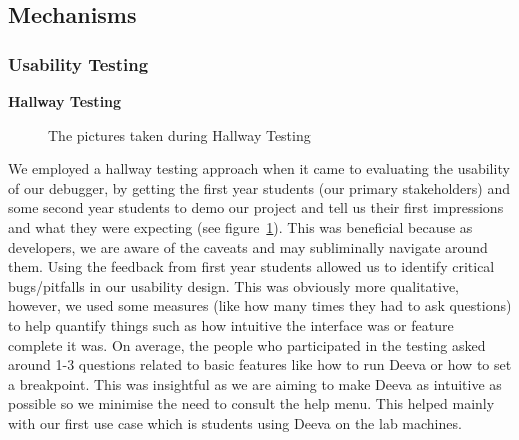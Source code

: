 \documentclass[11pt, a4paper]{article}
\begin{document}
\subsection{Mechanisms}
\subsubsection{Usability Testing}

\textbf{Hallway Testing}
\begin{figure}[h!]
\centering
{}
\quad
{}
\caption{The pictures taken during Hallway Testing}
\label{fig:hallway}
\end{figure}

We employed a hallway testing approach when it came to evaluating the usability of our debugger, by getting the first year students (our primary stakeholders) and some second year students to demo our project and tell us their first impressions and what they were expecting (see figure~\ref{fig:hallway}).
This was beneficial because as developers, we are aware of the caveats and may subliminally navigate around them.
Using the feedback from first year students allowed us to identify critical bugs/pitfalls in our usability design.
This was obviously more qualitative, however, we used some measures (like how many times they had to ask questions) to help quantify things such as how intuitive the interface was or feature complete it was.
On average, the people who participated in the testing asked around 1-3 questions related to basic features like how to run Deeva or how to set a breakpoint.
This was insightful as we are aiming to make Deeva as intuitive as possible so we minimise the need to consult the help menu.
This helped mainly with our first use case which is students using Deeva on the lab machines.
\end{document}
